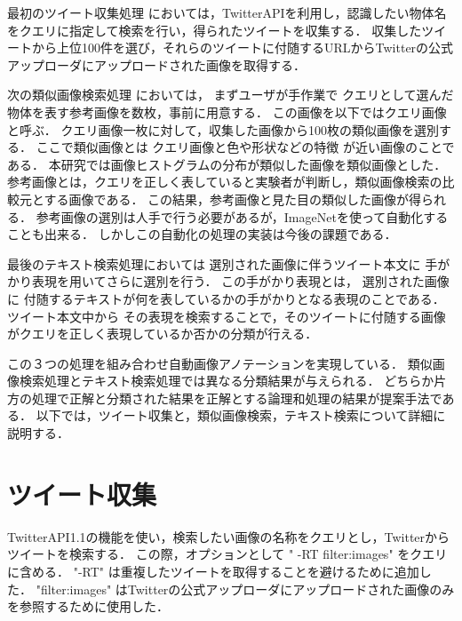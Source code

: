 
最初のツイート収集処理
においては，TwitterAPIを利用し，認識したい物体名をクエリに指定して検索を行い，得られたツイートを収集する．
収集したツイートから上位100件を選び，それらのツイートに付随するURLからTwitterの公式アップローダにアップロードされた画像を取得する．

次の類似画像検索処理
においては，
まずユーザが手作業で
クエリとして選んだ物体を表す参考画像を数枚，事前に用意する．
この画像を以下ではクエリ画像と呼ぶ．
クエリ画像一枚に対して，収集した画像から100枚の類似画像を選別する．
ここで類似画像とは
クエリ画像と色や形状などの特徴
が近い画像のことである．
本研究では画像ヒストグラムの分布が類似した画像を類似画像とした．
参考画像とは，クエリを正しく表していると実験者が判断し，類似画像検索の比較元とする画像である．
この結果，参考画像と見た目の類似した画像が得られる．
参考画像の選別は人手で行う必要があるが，ImageNetを使って自動化することも出来る．
しかしこの自動化の処理の実装は今後の課題である．


最後のテキスト検索処理においては
選別された画像に伴うツイート本文に
手がかり表現を用いてさらに選別を行う．
この手がかり表現とは，
選別された画像に
付随するテキストが何を表しているかの手がかりとなる表現のことである．
ツイート本文中から
その表現を検索することで，そのツイートに付随する画像がクエリを正しく表現しているか否かの分類が行える．

この３つの処理を組み合わせ自動画像アノテーションを実現している．
類似画像検索処理とテキスト検索処理では異なる分類結果が与えられる．
どちらか片方の処理で正解と分類された結果を正解とする論理和処理の結果が提案手法である．
以下では，ツイート収集と，類似画像検索，テキスト検索について詳細に説明する．

\section{ツイート収集}
\label{sec:tweetCollect}
TwitterAPI1.1の機能を使い，検索したい画像の名称をクエリとし，Twitterからツイートを検索する．
この際，オプションとして " -RT filter:images" をクエリに含める．
"-RT" は重複したツイートを取得することを避けるために追加した．
"filter:images" はTwitterの公式アップローダにアップロードされた画像のみを参照するために使用した．

